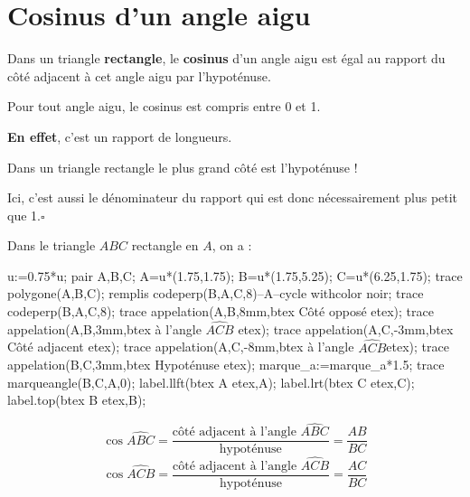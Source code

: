 \section{Cosinus d'un angle aigu}
\begin{definition}
    Dans un triangle {\bfseries rectangle}, le \textbf{cosinus} d'un angle aigu est égal au rapport du côté adjacent à cet angle aigu par l'hypoténuse.
\end{definition}

\begin{remarque}
    Pour tout angle aigu, le cosinus est compris entre 0 et 1.

    {\bfseries En effet}, c'est un rapport de longueurs.\par
    Dans un triangle rectangle le plus grand côté est l'hypoténuse !\par
    Ici, c'est aussi le dénominateur du rapport qui est donc nécessairement plus petit que 1.$\square$
\end{remarque}

\begin{exemples*1}
    Dans le triangle $ABC$ rectangle en $A$, on a : 
    
    \medskip
    \begin{minipage}{0.4\linewidth}
        \begin{Geometrie}[CoinHD={(5u,4.5u)}]
            u:=0.75*u;            
            pair A,B,C;
            A=u*(1.75,1.75);
            B=u*(1.75,5.25);
            C=u*(6.25,1.75);
            trace polygone(A,B,C);
            remplis codeperp(B,A,C,8)--A--cycle withcolor noir;
            trace codeperp(B,A,C,8);
            trace appelation(A,B,8mm,btex Côté opposé etex);
            trace appelation(A,B,3mm,btex à l'angle $\widehat{ACB}$ etex);
            trace appelation(A,C,-3mm,btex Côté adjacent etex);
            trace appelation(A,C,-8mm,btex à l'angle $\widehat{ACB}$etex);
            trace appelation(B,C,3mm,btex Hypoténuse etex);
            marque_a:=marque_a*1.5;    
            trace marqueangle(B,C,A,0);
            label.llft(btex A etex,A);
            label.lrt(btex C etex,C);
            label.top(btex B etex,B);
        \end{Geometrie}
    \end{minipage}
    \begin{minipage}{0.55\linewidth}        
        $$\cos\widehat{ABC}=\frac{\mbox{côté adjacent à l'angle $\widehat{ABC}$}}{\mbox{hypoténuse}}=\frac{AB}{BC}$$
        $$\cos\widehat{ACB}=\frac{\mbox{côté adjacent à l'angle $\widehat{ACB}$}}{\mbox{hypoténuse}}=\frac{AC}{BC}$$
    \end{minipage}
\end{exemples*1}
